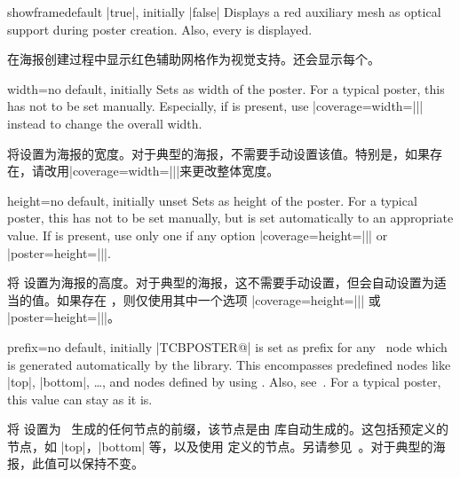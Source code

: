 \begin{posterTcbKey}[][doc new=2017-07-03]{showframe}{}{default |true|, initially |false|}
Displays a red auxiliary mesh as optical support during poster creation.
Also, every  is displayed.

在海报创建过程中显示红色辅助网格作为视觉支持。还会显示每个。
\end{posterTcbKey}


\begin{posterTcbKey}[][doc new=2017-07-03]{width}{=}{no default, initially }
Sets  as width of the poster. For a typical poster, this has not
to be set manually. Especially, if  is present,
use |coverage={width=||}| instead to change the overall width.

将设置为海报的宽度。对于典型的海报，不需要手动设置该值。特别是，如果存在，请改用|coverage={width=||}|来更改整体宽度。
\end{posterTcbKey}


\begin{posterTcbKey}[][doc new=2017-07-03]{height}{=}{no default, initially unset}
Sets  as height of the poster. For a typical poster, this has not
to be set manually, but is set automatically to an appropriate value.
If  is present, use only one if any option
|coverage={height=||}| or |poster={height=||}|.

将  设置为海报的高度。对于典型的海报，这不需要手动设置，但会自动设置为适当的值。如果存在 ，则仅使用其中一个选项 |coverage={height=||}| 或 |poster={height=||}|。
\end{posterTcbKey}


\begin{posterTcbKey}[][doc new=2017-07-03]{prefix}{=}{no default, initially |TCBPOSTER@|}
 is set as prefix for any \tikzname\ node which is generated
automatically by the  library. This encompasses predefined
nodes like |top|, |bottom|, \ldots, and nodes defined by using
. Also, see~.
For a typical poster, this value can stay as it is.

将  设置为 \tikzname\ 生成的任何节点的前缀，该节点是由  库自动生成的。这包括预定义的节点，如 |top|，|bottom| 等，以及使用  定义的节点。另请参见~。对于典型的海报，此值可以保持不变。
\end{posterTcbKey}


